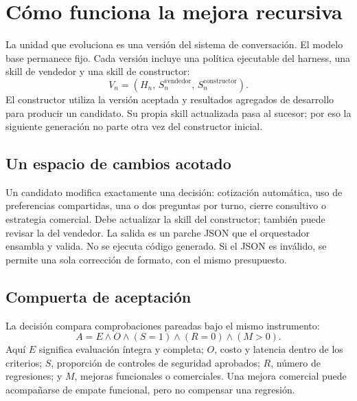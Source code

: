 \documentclass[11pt,a4paper]{article}
\begin{document}
\newpage
\section{Cómo funciona la mejora recursiva}
La unidad que evoluciona es una versión del sistema de conversación. El modelo
base permanece fijo. Cada versión incluye una política ejecutable del harness,
una skill de vendedor y una skill de constructor:
\[
 V_n=(H_n,\,S_n^{\mathrm{vendedor}},\,S_n^{\mathrm{constructor}}).
\]
El constructor utiliza la versión aceptada y resultados agregados de desarrollo
para producir un candidato. Su propia skill actualizada pasa al sucesor; por eso
la siguiente generación no parte otra vez del constructor inicial.

\begin{center}
\end{center}

\subsection{Un espacio de cambios acotado}
Un candidato modifica exactamente una decisión: cotización automática, uso de
preferencias compartidas, una o dos preguntas por turno, cierre consultivo o
estrategia comercial. Debe actualizar la skill del constructor; también puede
revisar la del vendedor. La salida es un parche JSON que el orquestador ensambla y
valida. No se ejecuta código generado. Si el JSON es inválido, se permite una sola
corrección de formato, con el mismo presupuesto.

\subsection{Compuerta de aceptación}
La decisión compara comprobaciones pareadas bajo el mismo instrumento:
\[
 A=E\land O\land(S=1)\land(R=0)\land(M>0).
\]
Aquí $E$ significa evaluación íntegra y completa; $O$, costo y latencia dentro de
los criterios; $S$, proporción de controles de seguridad aprobados; $R$, número de
regresiones; y $M$, mejoras funcionales o comerciales. Una mejora comercial puede
acompañarse de empate funcional, pero no compensar una regresión.
\end{document}
